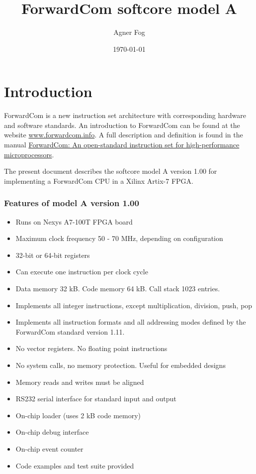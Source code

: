 \documentclass[11pt,a4paper,oneside,openright]{report}
\newcommand{\vv}{ \vspace{2mm} }   %
\begin{document}
\title{ForwardCom softcore model A}
\author{Agner Fog}
\date{\today}
\maketitle
\RaggedRight

\tableofcontents
\setcounter{secnumdepth}{1}


\chapter{Introduction}
ForwardCom is a new instruction set architecture with corresponding hardware and software standards. An introduction to ForwardCom can be found at the website \href{https://www.forwardcom.info}{www.forwardcom.info}. 
A full description and definition is found in the manual 
\href{https://github.com/ForwardCom/manual/raw/master/forwardcom.pdf}{ForwardCom: An open-standard instruction set for high-performance microprocessors}.
\vv

The present document describes the softcore model A version 1.00 
for implementing a ForwardCom CPU in a Xilinx Artix-7 FPGA.
\vv

\subsection{Features of model A version 1.00}
\begin{itemize}
\item Runs on Nexys A7-100T FPGA board
\item Maximum clock frequency 50 - 70 MHz, depending on configuration
\item 32-bit or 64-bit registers
\item Can execute one instruction per clock cycle
\item Data memory 32 kB. Code memory 64 kB. Call stack 1023 entries.
\item Implements all integer instructions, except multiplication, division, push, pop
\item Implements all instruction formats and all addressing modes defined by the ForwardCom standard version 1.11.
\item No vector registers. No floating point instructions
\item No system calls, no memory protection. Useful for embedded designs
\item Memory reads and writes must be aligned
\item RS232 serial interface for standard input and output
\item On-chip loader (uses 2 kB code memory)
\item On-chip debug interface
\item On-chip event counter
\item Code examples and test suite provided
\end{itemize}
\vv
\end{document}
